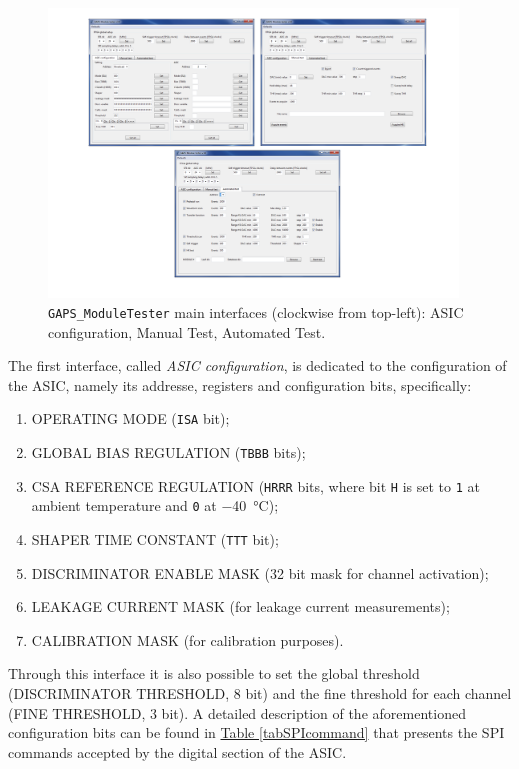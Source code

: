 \begin{figure}[h!]
    \centering
    \includegraphics[width=0.97\textwidth]{Images/chap2/moduletester.pdf}
    \caption{\texttt{GAPS\_ModuleTester} main interfaces (clockwise from top-left): ASIC configuration, Manual Test, Automated Test.}
    \label{figmodtest}
\end{figure}

\par
The first interface, called \textit{ASIC configuration}, is dedicated to the configuration of the ASIC, namely its addresse, registers and configuration bits, specifically:

\begin{enumerate}
    \itemsep0em 
    \item OPERATING MODE (\texttt{ISA} bit);
    \item GLOBAL BIAS REGULATION (\texttt{TBBB} bits); %
    \item CSA REFERENCE REGULATION (\texttt{HRRR} bits, where bit \texttt{H} is set to \texttt{1} at ambient temperature and \texttt{0} at \SI{-40}{\celsius});
    \item SHAPER TIME CONSTANT (\texttt{TTT} bit);
    \item DISCRIMINATOR ENABLE MASK (32 bit mask for channel activation);
    \item LEAKAGE CURRENT MASK (for leakage current measurements);
    \item CALIBRATION MASK (for calibration purposes).
\end{enumerate}

\noindent
Through this interface it is also possible to set the global threshold (DISCRIMINATOR THRESHOLD, 8 bit) and the fine threshold for each channel (FINE THRESHOLD, 3 bit). A detailed description of the aforementioned configuration bits can be found in \hyperref[tabSPIcommand]{Table \ref{tabSPIcommand}} that presents the SPI commands accepted by the digital section of the ASIC. %

